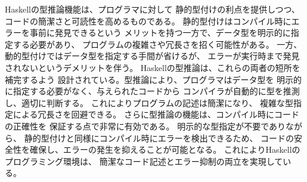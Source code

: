 \documentclass{cssspaper}
\begin{document}
\begin{itemize}
                Haskellの型推論機能は、プログラマに対して
                静的型付けの利点を提供しつつ、
                コードの簡潔さと可読性を高めるものである。
                静的型付けはコンパイル時にエラーを事前に発見できるという
                メリットを持つ一方で、データ型を明示的に指定する必要があり、
                プログラムの複雑さや冗長さを招く可能性がある。
                一方、動的型付けではデータ型を指定する手間が省けるが、
                エラーが実行時まで発見されないというデメリットを伴う。
                Haskellの型推論は、これらの両者の短所を補完するよう
                設計されている。型推論により、プログラマはデータ型を
                明示的に指定する必要がなく、与えられたコードから
                コンパイラが自動的に型を推測し、適切に判断する。
                これによりプログラムの記述は簡潔になり、
                複雑な型指定による冗長さを回避できる。
                さらに型推論の機能は、コンパイル時にコードの正確性を
                保証する点で非常に有効である。
                明示的な型指定が不要でありながら、
                静的型付けと同様にコンパイル時にエラーを検出できるため、
                コードの安全性を確保し、エラーの発生を抑えることが可能となる。
                これによりHaskellのプログラミング環境は、
                簡潔なコード記述とエラー抑制の両立を実現している。

                



            \end{itemize}
\end{document}
